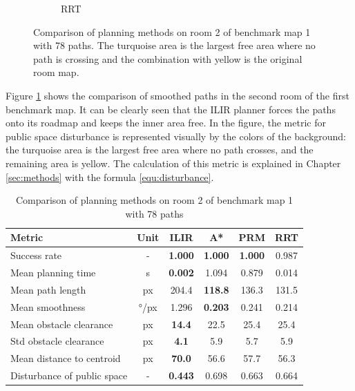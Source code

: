 \begin{figure}[h]
\begin{subfigure}{.25\textwidth}
      \caption{RRT}
    \end{subfigure}
    \caption[Comparison of planning methods on room 2 of benchmark map 1]{Comparison of planning methods on room 2 of benchmark map 1 with 78 paths. The turquoise area is the largest free area where no path is crossing and the combination with yellow is the original room map.}
    \label{fig:ryu_room2_comparison}
\end{figure}

Figure \ref{fig:ryu_room2_comparison} shows the comparison of smoothed paths in the second room of the first benchmark map. It can be clearly seen that the ILIR planner forces the paths onto its roadmap and keeps the inner area free. In the figure, the metric for public space disturbance is represented visually by the colors of the background: the turquoise area is the largest free area where no path crosses, and the remaining area is yellow. The calculation of this metric is explained in Chapter \ref{sec:methods} with the formula \ref{equ:disturbance}.

\begin{table}[ht]
\centering
\begin{tabular}{lc|cccc}
\hline
\textbf{Metric} & \textbf{Unit} & \textbf{ILIR} & \textbf{A*} & \textbf{PRM} & \textbf{RRT} \\
\hline
Success rate & -                & \textbf{1.000}          & \textbf{1.000}          & \textbf{1.000}      & 0.987 \\
Mean planning time & s          & \textbf{0.002} & 1.094         & 0.879     & 0.014 \\
Mean path length & px           & 204.4          & \textbf{118.8} & 136.3    & 131.5 \\
Mean smoothness & °/px          & 1.296         & \textbf{0.203} & 0.241    & 0.214 \\
Mean obstacle clearance & px    & \textbf{14.4} & 22.5          & 25.4      & 25.4 \\
Std obstacle clearance & px     & \textbf{4.1}  & 5.9           & 5.7       & 5.9 \\
Mean distance to centroid & px  & \textbf{70.0}          & 56.6          & 57.7      & 56.3 \\
Disturbance of public space & - & \textbf{0.443} & 0.698          & 0.663      & 0.664 \\
\hline
\end{tabular}
\caption{Comparison of planning methods on room 2 of benchmark map 1 with 78 paths}
\label{tab:room2_results}
\end{table}

